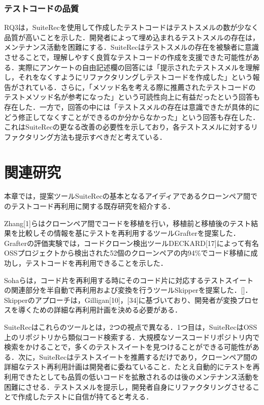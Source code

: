 \documentclass[12pt]{jarticle} %
\begin{document}
\subsubsection{テストコードの品質}
RQ3は，{\sf SuiteRec}を使用して作成したテストコードはテストスメルの数が少なく品質が高いことを示した．開発者によって埋め込まれるテストスメルの存在は，メンテナンス活動を困難にする．{\sf SuiteRec}はテストスメルの存在を被験者に意識させることで，理解しやすく良質なテストコードの作成を支援できた可能性がある．実際にアンケートの自由記述欄の回答には「提示されたテストスメルを理解し，それをなくすようにリファクタリングしテストコードを作成した」という報告がされている．さらに，「メソッド名を考える際に推薦されたテストコードのテストメソッド名が参考になった」という可読性向上に有益だったという回答も存在した．一方で，回答の中には「テストスメルの存在は意識できたが具体的にどう修正してなくすことができるのか分からなかった」という回答も存在した．これは{\sf SuiteRec}の更なる改善の必要性を示しており，各テストスメルに対するリファクタリング方法も提示すべきだと考えている．
\newpage
\section{関連研究}
本章では，提案ツール{\sf SuiteRec}の基本となるアイディアであるクローンペア間でのテストコード再利用に関する既存研究を紹介する．

Zhang[1]らはクローンペア間でコードを移植を行い，移植前と移植後のテスト結果を比較しその情報を基にテストを再利用するツール{\sf Grafter}を提案した．{\sf Grafter}の評価実験では，コードクローン検出ツール{\sf DECKARD}[17]によって有名OSSプロジェクトから検出された52個のクローンペアの内94\%でコード移植に成功し，テストコードを再利用できることを示した．

Sohaらは，コード片を再利用する時にそのコード片に対応するテストスイートの関連部分を半自動で再利用および変換を行うツール{\sf Skipper}を提案した．[]．{ \sf Skipper}のアプローチは，Gilligan[10]，[34]に基づいており、開発者が変換プロセスを導くための詳細な再利用計画を決める必要がある．

{\sf SuiteRec}はこれらのツールとは，2つの視点で異なる．1つ目は，{\sf SuiteRec}はOSS上のリポジトリから類似コード検索する．大規模なソースコードリポジトリ内で検索をかけることで，多くのテストスイートを見つけることができる可能性がある．次に，{\sf SuiteRec}はテストスイートを推薦するだけであり，クローンペア間の詳細なテスト再利用計画は開発者に委ねていること．たとえ自動的にテストを再利用できたとしても品質の低いコードを拡散されるのは後のメンテナンス活動を困難にさせる．テストスメルを提示し，開発者自身にリファクタリングさせることで作成したテストに自信が持てると考える．
\end{document}
